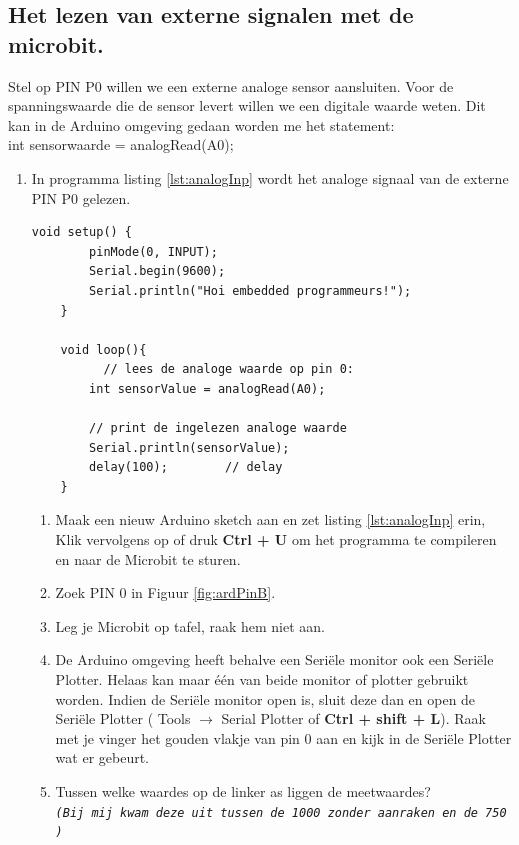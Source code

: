 \subsection{Het lezen van externe signalen met de microbit.}

Stel op PIN P0 willen we een externe analoge sensor aansluiten. Voor de spanningswaarde die de sensor levert willen we een digitale waarde weten. 
Dit kan in de Arduino omgeving gedaan worden me het statement:\\

int sensorwaarde = \textcolor{arduinoOrange}{analogRead}(A0);

\begin{enumerate}
\item In programma listing \ref{lst:analogInp} wordt het analoge signaal van de externe PIN P0 gelezen.
\begin{lstlisting}[numbers=none ,caption= inlezen via een analoog signaal.,label={lst:analogInp}]
	void setup() {  
		pinMode(0, INPUT); 
		Serial.begin(9600);
		Serial.println("Hoi embedded programmeurs!");
	}
	
	void loop(){
          // lees de analoge waarde op pin 0:
        int sensorValue = analogRead(A0);
        
        // print de ingelezen analoge waarde
        Serial.println(sensorValue);
        delay(100);        // delay 
	}

\end{lstlisting}
\begin{enumerate}
	\item  Maak een nieuw Arduino sketch aan en zet listing \ref{lst:analogInp} erin, Klik vervolgens op  of druk \colorbox{mygray}{\textbf{Ctrl + U}} om het programma te compileren en naar de Microbit te sturen. 
\item Zoek PIN 0 in Figuur \ref{fig:ardPinB}.
\item Leg je Microbit op tafel, raak hem niet aan. 
\item De Arduino omgeving heeft behalve een Seriële monitor ook een Seriële Plotter. Helaas kan maar één van beide monitor of plotter gebruikt worden. 
Indien de Seriële monitor open is, sluit deze dan en open de Seriële Plotter ( Tools $\rightarrow$ Serial Plotter of \colorbox{mygray}{\textbf{Ctrl + shift + L}}).
Raak met je vinger het gouden vlakje van pin 0 aan en kijk in de Seriële Plotter wat er gebeurt.
\item Tussen welke waardes op de linker as liggen de meetwaardes? \hrulefill \\	
 \footnotesize{\texttt{\textit{(Bij mij kwam deze uit tussen de 1000 zonder aanraken en de 750 )}} }
	

\end{enumerate}
\end{enumerate}
